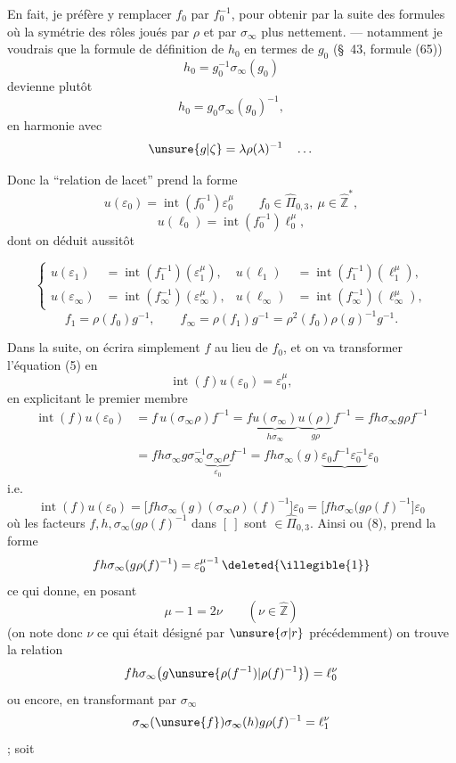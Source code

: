 En fait, je préfère y remplacer $f_0$ par $f_0^{-1}$, pour obtenir par la suite des formules où la symétrie des rôles joués par $\rho$ et par $\sigma_\infty$  plus nettement. --- notamment je voudrais que la formule de définition de $h_0$ en termes de $g_0$ (\S\ 43, formule (65))
\[
h_0=g_0^{-1}\sigma_\infty(g_0)
\]
devienne plutôt
\[
h_0=g_0\sigma_\infty(g_0)^{-1},
\]
en harmonie avec
\[
\unsure{g|\zeta}=\lambda\rho(\lambda)^{-1}\quad\dots
\]

Donc la ``relation de lacet'' prend la forme
\[
\tag{5}
u(\varepsilon_0)=\operatorname{int}(f_0^{-1})\varepsilon_0^\mu
\qquad f_0\in\widehat{\Pi}_{0,3},\ \mu\in\widehat{\mathbb Z}^{*},
\]
\[
\tag{6}
u(\ell_0)=\operatorname{int}(f_0^{-1})\ell_0^\mu,
\]
dont on déduit aussitôt



\[
\tag{7}
\left\{
\begin{aligned}
u(\varepsilon_1)&=\operatorname{int}(f_1^{-1})(\varepsilon_1^\mu),
&u(\ell_1)&=\operatorname{int}(f_1^{-1})(\ell_1^\mu),\\
u(\varepsilon_\infty)&=\operatorname{int}(f_\infty^{-1})(\varepsilon_\infty^\mu),
&u(\ell_\infty)&=\operatorname{int}(f_\infty^{-1})(\ell_\infty^\mu),
\end{aligned}
\right.
\]
\[
\tag{8}
f_1=\rho(f_0)g^{-1},\qquad
f_\infty=\rho(f_1)g^{-1}=\rho^2(f_0)\rho(g)^{-1}g^{-1}.
\]

Dans la suite, on écrira simplement $f$ au lieu de $f_0$, et on va transformer l'équation (5)  en
\[
\tag{8bis}
\operatorname{int}(f)u(\varepsilon_0)=\varepsilon_0^\mu,
\]
en explicitant le premier membre
\[
\begin{aligned}
\operatorname{int}(f)u(\varepsilon_0)
&=f\,u(\sigma_\infty\rho)f^{-1}
=f\underbrace{u(\sigma_\infty)}_{h\sigma_\infty}\underbrace{u(\rho)}_{g\rho}f^{-1}
=fh\sigma_\infty g\rho f^{-1}\\
&=fh\sigma_\infty g\sigma_\infty^{-1}\underbrace{\sigma_\infty\rho}_{\varepsilon_0}f^{-1}
=fh\sigma_\infty(g)\underbrace{\varepsilon_0f^{-1}\varepsilon_0^{-1}}\varepsilon_0
\end{aligned}
\]
i.e.
\[
\tag{9}
\operatorname{int}(f)u(\varepsilon_0)
=\bigl[fh\sigma_\infty(g)(\sigma_\infty\rho)(f)^{-1}\bigr]\varepsilon_0
=\bigl[fh\sigma_\infty(g\rho(f)^{-1}\bigr]\varepsilon_0
\]
où les  facteurs $f,h,\sigma_\infty(g\rho(f)^{-1}$ dans $[\ ]$ sont $\in\widehat{\Pi}_{0,3}$. Ainsi  ou (8), prend la forme
\[
fh\sigma_\infty(g\rho(f)^{-1})=\varepsilon_0^{\mu-1}\,\deleted{\illegible{1}}
\]
ce qui donne, en posant
\[
\tag{10}
\mu-1=2\nu\qquad(\nu\in\widehat{\mathbb Z})
\]
(on note donc $\nu$ ce qui était désigné par $\unsure{\sigma|r}$ précédemment) on trouve la relation
\[
fh\sigma_\infty\bigl(g\unsure{\rho(f^{-1})|\rho(f)^{-1}}\bigr)=\ell_0^\nu
\]
ou encore, en transformant par $\sigma_\infty$
\[
\sigma_\infty(\unsure{f})\sigma_\infty(h)g\rho(f)^{-1}=\ell_1^\nu
\]
; soit

